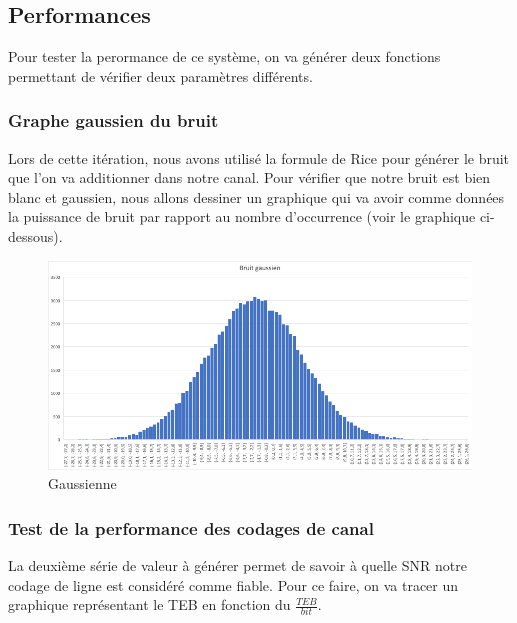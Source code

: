 \subsection{Performances}

Pour tester la perormance de ce système, on va générer deux fonctions permettant de vérifier deux paramètres différents.

\subsubsection{Graphe gaussien du bruit}

Lors de cette itération, nous avons utilisé la formule de Rice pour générer le bruit que l'on va additionner dans notre canal. Pour vérifier que notre bruit est bien blanc et gaussien, nous allons  dessiner un graphique qui va avoir comme données la puissance de bruit par rapport au nombre d'occurrence (voir le graphique ci-dessous).

\begin{figure}[H]
\centering
\includegraphics[width=1\textwidth]{img/gaussienne.png}
\caption{\label{fig:gaussienne}Gaussienne}
\end{figure}

\subsubsection{Test de la performance des codages de canal}

La deuxième série de valeur à générer permet de savoir à quelle SNR notre codage de ligne est considéré comme fiable.
Pour ce faire, on va tracer un graphique représentant le TEB en fonction du $\frac{TEB}{bit}$.

